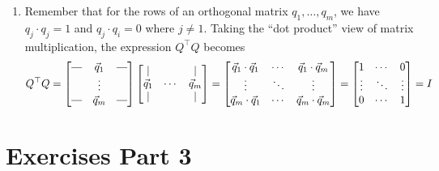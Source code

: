\documentclass[11pt]{article}
\newcommand{\rotvert}{\rotatebox[origin=c]{90}{$\vert$}}
\begin{document}
\begin{enumerate}
    \item[(b)] Remember that for the rows of an orthogonal matrix $q_1,\ldots,q_m$, we have $q_j\cdot q_j = 1$ and $q_j\cdot q_i = 0$ where $j\neq 1$. Taking the ``dot product'' view of matrix multiplication, the expression $Q^\top Q$ becomes \[ Q^\top Q = \begin{bmatrix} \rotvert & \vec{q}_1 & \rotvert \\  & \vdots &  \\ \rotvert & \vec{q}_m & \rotvert \end{bmatrix}\begin{bmatrix} \mid &  & \mid \\ \vec{q}_1 & \cdots & \vec{q}_m \\ \mid &  & \mid \end{bmatrix} = \begin{bmatrix} \vec{q}_1\cdot \vec{q}_1 & \cdots & \vec{q}_1\cdot \vec{q}_m \\ \vdots & \ddots & \vdots \\ \vec{q}_m\cdot \vec{q}_1 & \cdots & \vec{q}_m\cdot \vec{q}_m \end{bmatrix} = \begin{bmatrix} 1 & \cdots & 0 \\ \vdots & \ddots & \vdots \\ 0 & \cdots & 1 \end{bmatrix} = I \]
\end{enumerate}


\clearpage

\section*{Exercises Part 3}
\end{document}
